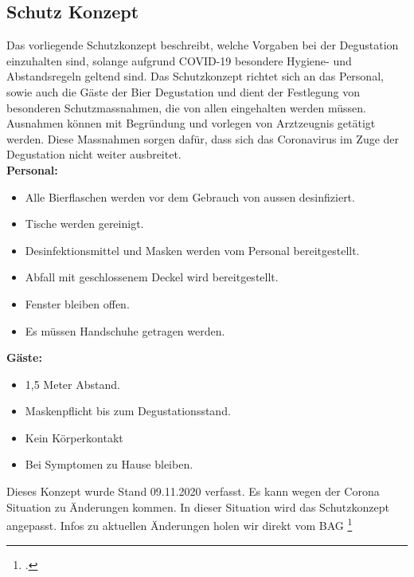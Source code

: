 \subsection{Schutz Konzept}
Das vorliegende Schutzkonzept beschreibt, welche Vorgaben bei der Degustation einzuhalten sind, solange aufgrund COVID-19 besondere Hygiene- und Abstandsregeln geltend sind. Das Schutzkonzept richtet sich an das Personal, sowie auch die Gäste der Bier Degustation und dient der Festlegung von besonderen Schutzmassnahmen, die von allen eingehalten werden müssen. Ausnahmen können mit Begründung und vorlegen von Arztzeugnis getätigt werden.
Diese Massnahmen sorgen dafür, dass sich das Coronavirus im Zuge der Degustation nicht weiter ausbreitet. 
\\
\textbf{Personal:}
\begin{itemize}
    \item Alle Bierflaschen werden vor dem Gebrauch von aussen desinfiziert.
    \item Tische werden gereinigt.
    \item Desinfektionsmittel und Masken werden vom Personal bereitgestellt.
    \item Abfall mit geschlossenem Deckel wird bereitgestellt.
    \item Fenster bleiben offen.
    \item Es müssen Handschuhe getragen werden.
\end{itemize}


\textbf{Gäste:}

\begin{itemize}
    \item 1,5 Meter Abstand.
    \item Maskenpflicht bis zum Degustationsstand.
    \item Kein Körperkontakt
    \item Bei Symptomen zu Hause bleiben.
\end{itemize}

Dieses Konzept wurde Stand 09.11.2020 verfasst.
Es kann wegen der Corona Situation zu Änderungen kommen. In dieser Situation wird das Schutzkonzept angepasst.
Infos zu aktuellen Änderungen holen wir direkt vom BAG \footcite[Bundesamt für Gesundheit BAG]{bag.admin}

